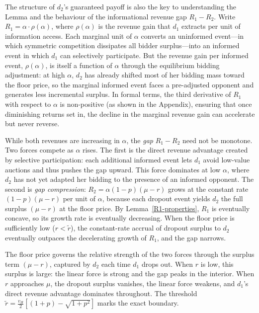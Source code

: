 \noindent The structure of $d_2$'s guaranteed payoff is also the key to understanding the Lemma and the behaviour of the informational revenue gap $R_1 - R_2$. Write $R_1 = \alpha \cdot \rho(\alpha)$, where $\rho(\alpha)$ is the revenue gain that $d_1$ extracts per unit of information access. Each marginal unit of $\alpha$ converts an uninformed event---in which symmetric competition dissipates all bidder surplus---into an informed event in which $d_1$ can selectively participate. But the revenue gain per informed event, $\rho(\alpha)$, is itself a function of $\alpha$ through the equilibrium bidding adjustment: at high $\alpha$, $d_2$ has already shifted most of her bidding mass toward the floor price, so the marginal informed event faces a pre-adjusted opponent and generates less incremental surplus. In formal terms, the third derivative of $R_1$ with respect to $\alpha$ is non-positive (as shown in the Appendix), ensuring that once diminishing returns set in, the decline in the marginal revenue gain can accelerate but never reverse.

\noindent While both revenues are increasing in $\alpha$, the \emph{gap} $R_1 - R_2$ need not be monotone. Two forces compete as $\alpha$ rises. The first is the direct revenue advantage created by selective participation: each additional informed event lets $d_1$ avoid low-value auctions and thus pushes the gap upward. This force dominates at low $\alpha$, where $d_2$ has not yet adapted her bidding to the presence of an informed opponent. The second is \emph{gap compression}: $R_2 = \alpha(1-p)(\mu - r)$ grows at the constant rate $(1-p)(\mu - r)$ per unit of $\alpha$, because each dropout event yields $d_2$ the full surplus $(\mu - r)$ at the floor price. By Lemma~\ref{R1-properties}, $R_1$ is eventually concave, so its growth rate is eventually decreasing. When the floor price is sufficiently low ($r < \tilde{r}$), the constant-rate accrual of dropout surplus to $d_2$ eventually outpaces the decelerating growth of $R_1$, and the gap narrows.

\noindent The floor price governs the relative strength of the two forces through the surplus term $(\mu - r)$, captured by $d_2$ each time $d_1$ drops out. When $r$ is low, this surplus is large: the linear force is strong and the gap peaks in the interior. When $r$ approaches $\mu$, the dropout surplus vanishes, the linear force weakens, and $d_1$'s direct revenue advantage dominates throughout. The threshold $\tilde{r} = \frac{v_H}{2}\left[(1+p) - \sqrt{1+p^2}\right]$ marks the exact boundary.

